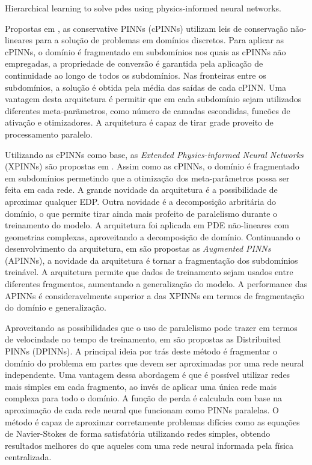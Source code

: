 Hierarchical learning to solve pdes using physics-informed neural networks.
\cite{han-etal:2023-hierarchical-learning}

Propostas em \cite{jagtap-etal:2020-convervative-pinns}, as conservative PINNs 
(cPINNs) utilizam leis de conservação não-lineares para a solução de problemas 
em domínios discretos. Para aplicar as cPINNs, o domínio é fragmentado em subdomínios
nos quais as cPINNs aão empregadas, a propriedade de conversão é garantida pela 
aplicação de continuidade ao longo de todos os subdomínios. Nas fronteiras entre
os subdomínios, a solução é obtida pela média das saídas de cada cPINN.
Uma vantagem desta arquitetura é permitir que em cada subdomínio sejam utilizados
diferentes meta-parãmetros, como número de camadas escondidas, funcões de ativação
e otimizadores.
A arquitetura é capaz de tirar grade proveito de processamento paralelo.  

Utilizando as cPINNs como base, as \textit{Extended Physics-informed Neural Networks}
(XPINNs) são propostas em \cite{jagtap-etal:2020-extended-pinns}. Assim como as 
cPINNs, o domínio é fragmentado em subdomínios permetindo que a otimização dos
meta-parâmetros possa ser feita em cada rede. 
A grande novidade da arquitetura é a possibilidade de aproximar qualquer EDP.
Outra novidade é a decomposição arbritária do domínio, o que permite tirar ainda
mais profeito de paralelismo durante o treinamento do modelo.
A arquitetura foi aplicada em PDE não-lineares com geometrias complexas, 
aproveitando a decomposição de domínio.
Continuando o desenvolvimento da arquitetura, em \cite{hu-etal:2023-augmented-pinns}
são propostas as \textit{Augmented PINNs} (APINNs), a novidade da arquitetura 
é tornar a fragmentação dos subdomínios treinável.
A arquitetura permite que dados de treinamento sejam usados entre diferentes 
fragmentos, aumentando a generalização do modelo.
A performance das APINNs é consideravelmente superior a das XPINNs em termos 
de fragmentação do domínio e generalização.

Aproveitando as possibilidades que o uso de paralelismo pode trazer em termos 
de velocindade no tempo de treinamento, em \cite{dwivedi:2019-distributed-pinns}
são propostas as Distribuited PINNs (DPINNs). A principal ideia por trás deste método
é fragmentar o domínio do problema em partes que devem ser aproximadas por uma rede
neural independente. Uma vantagem dessa abordagem é que é possível utilizar redes
mais simples em cada fragmento, ao invés de aplicar uma única rede mais complexa
para todo o domínio. A função de perda é calculada com base na aproximação de cada
rede neural que funcionam como PINNs paralelas. O método é capaz de aproximar 
corretamente problemas difícies como as equações de Navier-Stokes de forma satisfatória
utilizando redes simples, obtendo resultados melhores do que aqueles com uma
rede neural informada pela física centralizada.

